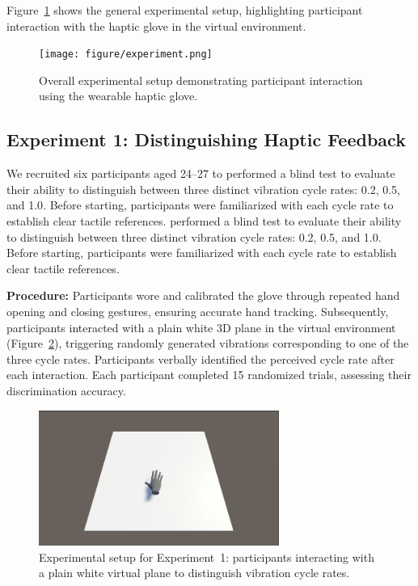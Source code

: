 \documentclass[graybox]{svmult}
\begin{document}
Figure~\ref{fig:experiment_setup} shows the general experimental setup, highlighting participant interaction with the haptic glove in the virtual environment.

\begin{figure}\centering
	\texttt{[image: figure/experiment.png]}%
	\caption{Overall experimental setup demonstrating participant interaction using the wearable haptic glove.}\label{fig:experiment_setup}
\end{figure}

\subsection{Experiment 1: Distinguishing Haptic Feedback}
We recruited six participants aged 24–27 to performed a blind test to evaluate their ability to distinguish between three distinct vibration cycle rates: 0.2, 0.5, and 1.0. Before starting, participants were familiarized with each cycle rate to establish clear tactile references.
performed a blind test to evaluate their ability to distinguish between three distinct vibration cycle rates: 0.2, 0.5, and 1.0. Before starting, participants were familiarized with each cycle rate to establish clear tactile references.

\textbf{Procedure:} Participants wore and calibrated the glove through repeated hand opening and closing gestures, ensuring accurate hand tracking. Subsequently, participants interacted with a plain white 3D plane in the virtual environment (Figure~\ref{fig:experiment1_setup}), triggering randomly generated vibrations corresponding to one of the three cycle rates. Participants verbally identified the perceived cycle rate after each interaction. Each participant completed 15 randomized trials, assessing their discrimination accuracy.

\begin{figure}\centering
	\includegraphics[width=0.7\textwidth]{figure/ex1.png}%
	\caption{Experimental setup for Experiment~1: participants interacting with a plain white virtual plane to distinguish vibration cycle rates.}\label{fig:experiment1_setup}
\end{figure}
\end{document}
